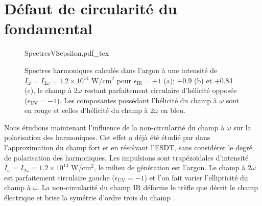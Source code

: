 \section{Défaut de circularité du fondamental}

\begin{figure}
\centering
\def\svgwidth{0.75\textwidth}
{SpectresVSepsilon.pdf_tex}
\caption{Spectres harmoniques calculés dans l'argon à une intensité de $I_\omega = I_{2\omega} = 1.2 \times 10^{14}$ W/cm$^2$ pour $\epsilon_{\text{IR}} = +1$ (a); +0.9 (b) et +0.84 (c), le champ à 2$\omega$ restant parfaitement circulaire d'hélicité opposée ($\epsilon_{\text{UV}} = -1$). Les composantes possédant l'hélicité du champ à $\omega$ sont en rouge et celles d'hélicité du champ à 2$\omega$ en bleu.}
\label{fig:SpectresVSepsilon}
\end{figure}

Nous étudions maintenant l'influence de la non-circularité du champ à $\omega$ sur la polarisation des harmoniques. Cet effet a déjà été étudié par  dans l'approximation du champ fort et  en résolvant l'ESDT, sans considérer le degré de polarisation des harmoniques. Les impulsions sont trapézoïdales d'intensité $I_\omega = I_{2\omega} = 1.2 \times 10^{14}$ W/cm$^2$, le milieu de génération est l'argon. Le champ à 2$\omega$ est parfaitement circulaire gauche ($\epsilon_{\text{UV}} = -1$) et l'on fait varier l'ellipticité du champ à $\omega$. La non-circularité du champ IR déforme le trèfle que décrit le champ électrique et brise la symétrie d'ordre trois du champ .

